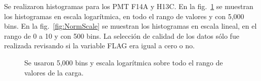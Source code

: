 \documentclass[11pt]{article}
\begin{document}
Se realizaron histogramas para los PMT F14A y H13C. En la fig.\ \ref{fig:LogScale} se muestran los histogramas en escala logarítmica, en todo el rango de valores y con 5,000 bins. En la fig.\ \ref{fig:NormScale} se muestran los histogramas en escala lineal, en el rango de 0 a 10 y con 500 bins. La selección de calidad de los datos sólo fue realizada revisando si la variable FLAG era igual a cero o no.

\begin{figure}[H]
\centering
{}

\caption{Se usaron 5,000 bins y escala logarítmica sobre todo el rango de valores de la carga.}
\label{fig:LogScale}
\end{figure}
\end{document}
